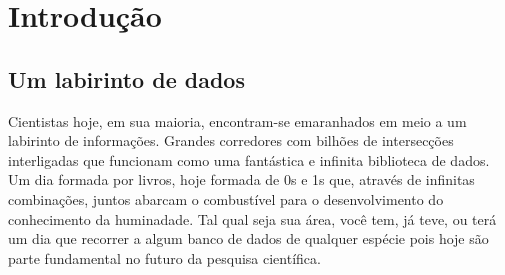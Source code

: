 


\chapter{Introdução}
\label{sec:Intro}


\section{Um labirinto de dados}
\label{sec:Intro:LabData}

Cientistas hoje, em sua maioria, encontram-se emaranhados em meio a um labirinto de informações. Grandes corredores com
bilhões de intersecções interligadas que funcionam como uma fantástica e infinita biblioteca de dados. Um dia formada
por livros, hoje formada de 0s e 1s que, através de infinitas combinações, juntos abarcam o combustível para o
desenvolvimento do conhecimento da huminadade. Tal qual seja sua área, você tem, já teve, ou terá um dia que recorrer a
algum banco de dados de qualquer espécie pois hoje são parte fundamental no futuro da pesquisa científica.

